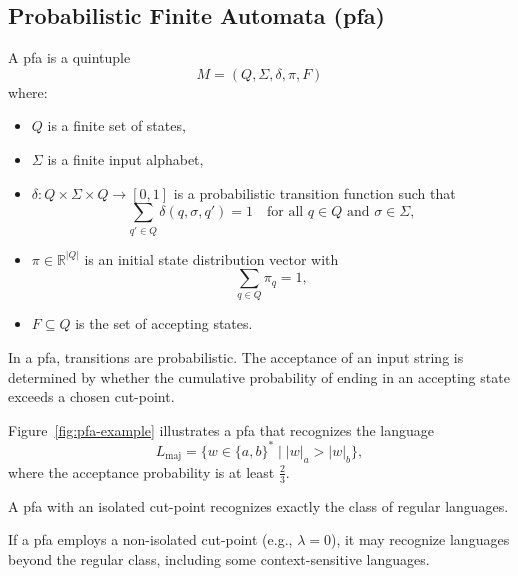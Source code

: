 
\subsection{Probabilistic Finite Automata (\gls{pfa})}
\label{subsec:pfa}

\begin{definition}
A \gls{pfa} is a quintuple 
\[
M = (Q, \Sigma, \delta, \pi, F)
\]
where:
\begin{itemize}
    \item \( Q \) is a finite set of states,
    \item \( \Sigma \) is a finite input alphabet,
    \item \( \delta: Q \times \Sigma \times Q \rightarrow [0,1] \) is a probabilistic transition function such that 
    \[
    \sum_{q' \in Q} \delta(q, \sigma, q') = 1 \quad \text{for all } q \in Q \text{ and } \sigma \in \Sigma,
    \]
    \item \( \pi \in \mathbb{R}^{|Q|} \) is an initial state distribution vector with 
    \[
    \sum_{q \in Q} \pi_q = 1,
    \]
    \item \( F \subseteq Q \) is the set of accepting states.
\end{itemize}
\end{definition}

\begin{remark}
In a \gls{pfa}, transitions are probabilistic. The acceptance of an input string is determined by whether the cumulative probability of ending in an accepting state exceeds a chosen cut-point.
\end{remark}

\begin{example}
Figure~\ref{fig:pfa-example} illustrates a \gls{pfa} that recognizes the language 
\[
L_{\text{maj}} = \{ w \in \{a,b\}^* \mid |w|_a > |w|_b \},
\]
where the acceptance probability is at least \( \frac{2}{3} \).
\end{example}

\begin{theorem}
\label{thm:rabin}
A \gls{pfa} with an isolated cut-point recognizes exactly the class of regular languages.
\end{theorem}

\begin{proposition}
If a \gls{pfa} employs a non-isolated cut-point (e.g., \(\lambda = 0\)), it may recognize languages beyond the regular class, including some context-sensitive languages.
\end{proposition}

